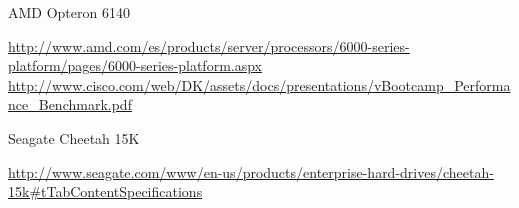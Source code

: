 \begin{thebibliography}{9}

 AMD Opteron 6140

\url{http://www.amd.com/es/products/server/processors/6000-series-platform/pages/6000-series-platform.aspx} \\

\url{http://www.cisco.com/web/DK/assets/docs/presentations/vBootcamp_Performance_Benchmark.pdf}

 Seagate Cheetah 15K

\url{http://www.seagate.com/www/en-us/products/enterprise-hard-drives/cheetah-15k#tTabContentSpecifications}

\end{thebibliography}
